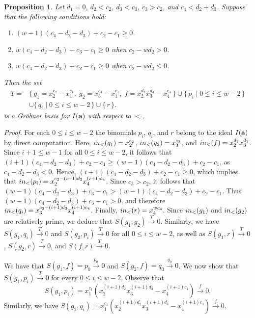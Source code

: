 \documentclass[10pt,a4paper]{amsart}
\newtheorem{prop1}[thm1]{Proposition}
\begin{document}
\begin{prop1} \label{CMBasic12} Let $d_1=0$, $d_{2}<c_{2}$, $d_{3}<c_{3}$, $c_3>c_2$, and $c_4<d_{2}+d_{3}$. Suppose that the following conditions hold:
\begin{enumerate} \item $(w-1)(c_{4}-d_{2}-d_{3})+c_{2}-c_{1} \geq 0$.
\item $w(c_{4}-d_{2}-d_{3})+c_{3}-c_{1} \geq 0$ when $c_{2}-wd_{2}> 0$.
\item $w(c_{4}-d_{2}-d_{3})+c_{2}-c_{1} \geq 0$ when $c_{2}-wd_{2} \leq 0$.
\end{enumerate}
Then the set \[
\begin{aligned}
T = {} & \{\, g_{1}=x_{2}^{c_2}-x_{1}^{c_1},\;
          g_{2}=x_{3}^{c_3}-x_{1}^{c_1},\;
          f=x_{2}^{d_2}x_{3}^{d_3}-x_{4}^{c_4} \,\} \cup \{\, p_i \mid 0 \le i \le w-2 \,\} \\
      & 
        \cup \{\, q_i \mid 0 \le i \le w-2 \,\}
        \cup \{\, r \,\}.
\end{aligned}
\]
is a Gr\"obner basis for $I({\bf a})$ with respect to $<$.
\end{prop1}

{\em \noindent Proof.} For each $0 \leq i \leq w-2$ the binomials $p_{i}$, $q_{i}$, and $r$ belong to the ideal $I({\bf a})$ by direct computation. Here, ${\rm in}_{<}(g_{1})=x_{2}^{c_{2}}$, ${\rm in}_{<}(g_{2})=x_{3}^{c_{3}}$, and ${\rm in}_{<}(f)=x_{2}^{d_{2}}x_{3}^{d_{3}}$. Since $i+1 \leq w-1$ for all $0 \leq i \leq w-2$, it follows that $(i+1)(c_{4}-d_{2}-d_{3})+c_{2}-c_{1} \geq (w-1)(c_{4}-d_{2}-d_{3})+c_{2}-c_{1}$, as $c_{4}-d_{2}-d_{3}<0$. Hence, $(i+1)(c_{4}-d_{2}-d_{3})+c_{2}-c_{1} \geq 0$, which implies that ${\rm in}_{<}(p_{i})=x_{2}^{c_{2}-(i+1)d_{2}}x_{4}^{(i+1)c_{4}}$. Since $c_3>c_2$, it follows that $(w-1)(c_{4}-d_{2}-d_{3})+c_{3}-c_{1}>(w-1)(c_{4}-d_{2}-d_{3})+c_{2}-c_{1}$. Thus $(w-1)(c_{4}-d_{2}-d_{3})+c_{3}-c_{1} >0$, and therefore ${\rm in}_{<}(q_{i})=x_{3}^{c_{3}-(i+1)d_3}x_{4}^{(i+1)c_{4}}$. Finally, ${\rm in}_{<}(r)=x_{4}^{wc_4}$. Since ${\rm in}_{<}(g_{1})$ and ${\rm in}_{<}(g_{2})$ are relatively prime, we deduce that $S(g_{1},g_{2}) \stackrel{T} {\longrightarrow} 0$. Similarly, we have $S(g_{1},q_{i}) \stackrel{T} {\longrightarrow} 0$ and $S(g_{2},p_i) \stackrel{T} {\longrightarrow} 0$ for all $0 \leq i \leq w-2$, as well as $S(g_{1},r) \stackrel{T} {\longrightarrow} 0$, $S(g_{2},r) \stackrel{T} {\longrightarrow} 0$, and $S(f,r) \stackrel{T} {\longrightarrow} 0$. 

We have that $S(g_{1},f)=p_{0} \stackrel{p_{0}} {\longrightarrow} 0$ and $S(g_{2},f)=q_{0} \stackrel{q_{0}} {\longrightarrow} 0$. We now show that $S(g_{1}, p_{i}) \stackrel{T}{\longrightarrow} 0$ for every $0 \leq i \leq w-2$. Observe that $$S(g_{1},p_{i})=x_{1}^{c_1}(x_{2}^{(i+1)d_2}x_{3}^{(i+1)d_3}-x_{4}^{(i+1)c_4}) \stackrel{f} {\longrightarrow} 0.$$ Similarly, we have $S(g_{2},q_{i})=x_{1}^{c_1}(x_{2}^{(i+1)d_2}x_{3}^{(i+1)d_3}-x_{4}^{(i+1)c_4}) \stackrel{f} {\longrightarrow} 0.$ 
\end{document}
